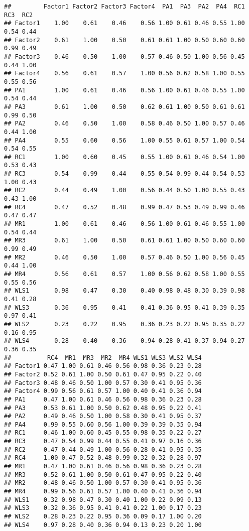 \documentclass[]{book}
\begin{document}
\begin{verbatim}
##         Factor1 Factor2 Factor3 Factor4  PA1  PA3  PA2  PA4  RC1  RC3  RC2
## Factor1    1.00    0.61    0.46    0.56 1.00 0.61 0.46 0.55 1.00 0.54 0.44
## Factor2    0.61    1.00    0.50    0.61 0.61 1.00 0.50 0.60 0.60 0.99 0.49
## Factor3    0.46    0.50    1.00    0.57 0.46 0.50 1.00 0.56 0.45 0.44 1.00
## Factor4    0.56    0.61    0.57    1.00 0.56 0.62 0.58 1.00 0.55 0.55 0.56
## PA1        1.00    0.61    0.46    0.56 1.00 0.61 0.46 0.55 1.00 0.54 0.44
## PA3        0.61    1.00    0.50    0.62 0.61 1.00 0.50 0.61 0.61 0.99 0.50
## PA2        0.46    0.50    1.00    0.58 0.46 0.50 1.00 0.57 0.46 0.44 1.00
## PA4        0.55    0.60    0.56    1.00 0.55 0.61 0.57 1.00 0.54 0.54 0.55
## RC1        1.00    0.60    0.45    0.55 1.00 0.61 0.46 0.54 1.00 0.53 0.43
## RC3        0.54    0.99    0.44    0.55 0.54 0.99 0.44 0.54 0.53 1.00 0.43
## RC2        0.44    0.49    1.00    0.56 0.44 0.50 1.00 0.55 0.43 0.43 1.00
## RC4        0.47    0.52    0.48    0.99 0.47 0.53 0.49 0.99 0.46 0.47 0.47
## MR1        1.00    0.61    0.46    0.56 1.00 0.61 0.46 0.55 1.00 0.54 0.44
## MR3        0.61    1.00    0.50    0.61 0.61 1.00 0.50 0.60 0.60 0.99 0.49
## MR2        0.46    0.50    1.00    0.57 0.46 0.50 1.00 0.56 0.45 0.44 1.00
## MR4        0.56    0.61    0.57    1.00 0.56 0.62 0.58 1.00 0.55 0.55 0.56
## WLS1       0.98    0.47    0.30    0.40 0.98 0.48 0.30 0.39 0.98 0.41 0.28
## WLS3       0.36    0.95    0.41    0.41 0.36 0.95 0.41 0.39 0.35 0.97 0.41
## WLS2       0.23    0.22    0.95    0.36 0.23 0.22 0.95 0.35 0.22 0.16 0.95
## WLS4       0.28    0.40    0.36    0.94 0.28 0.41 0.37 0.94 0.27 0.36 0.35
##          RC4  MR1  MR3  MR2  MR4 WLS1 WLS3 WLS2 WLS4
## Factor1 0.47 1.00 0.61 0.46 0.56 0.98 0.36 0.23 0.28
## Factor2 0.52 0.61 1.00 0.50 0.61 0.47 0.95 0.22 0.40
## Factor3 0.48 0.46 0.50 1.00 0.57 0.30 0.41 0.95 0.36
## Factor4 0.99 0.56 0.61 0.57 1.00 0.40 0.41 0.36 0.94
## PA1     0.47 1.00 0.61 0.46 0.56 0.98 0.36 0.23 0.28
## PA3     0.53 0.61 1.00 0.50 0.62 0.48 0.95 0.22 0.41
## PA2     0.49 0.46 0.50 1.00 0.58 0.30 0.41 0.95 0.37
## PA4     0.99 0.55 0.60 0.56 1.00 0.39 0.39 0.35 0.94
## RC1     0.46 1.00 0.60 0.45 0.55 0.98 0.35 0.22 0.27
## RC3     0.47 0.54 0.99 0.44 0.55 0.41 0.97 0.16 0.36
## RC2     0.47 0.44 0.49 1.00 0.56 0.28 0.41 0.95 0.35
## RC4     1.00 0.47 0.52 0.48 0.99 0.32 0.32 0.28 0.97
## MR1     0.47 1.00 0.61 0.46 0.56 0.98 0.36 0.23 0.28
## MR3     0.52 0.61 1.00 0.50 0.61 0.47 0.95 0.22 0.40
## MR2     0.48 0.46 0.50 1.00 0.57 0.30 0.41 0.95 0.36
## MR4     0.99 0.56 0.61 0.57 1.00 0.40 0.41 0.36 0.94
## WLS1    0.32 0.98 0.47 0.30 0.40 1.00 0.22 0.09 0.13
## WLS3    0.32 0.36 0.95 0.41 0.41 0.22 1.00 0.17 0.23
## WLS2    0.28 0.23 0.22 0.95 0.36 0.09 0.17 1.00 0.20
## WLS4    0.97 0.28 0.40 0.36 0.94 0.13 0.23 0.20 1.00
\end{verbatim}
\end{document}
